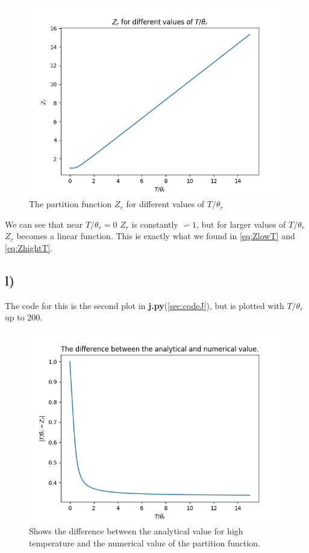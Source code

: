 \documentclass[a4paper,norsk, 10pt]{article}
\begin{document}
\begin{figure}[H]
\centering
\includegraphics[scale=0.5]{k.png}
\caption{The partition function $Z_r$ for different values of $T/\theta_r$}
\end{figure}

We can see that near $T/\theta_r = 0$ $Z_r$ is constantly $\backsim 1$, but for larger values of $T/\theta_r$ $Z_r$ becomes a linear function. This is exactly what we found in \eqref{eq:ZlowT} and \eqref{eq:ZhightT}.

\subsection{l)}

The code for this is the second plot in \textbf{j.py}(\ref{sec:codeJ}), but is plotted with $T/\theta_r$ up to $200$.

\begin{figure}[H]
\centering
\includegraphics[scale=0.5]{diff_k.png}
\caption{Shows the difference between the analytical value for high temperature and the numerical value of the partition function.}
\end{figure}\label{fig:diff}
\end{document}
